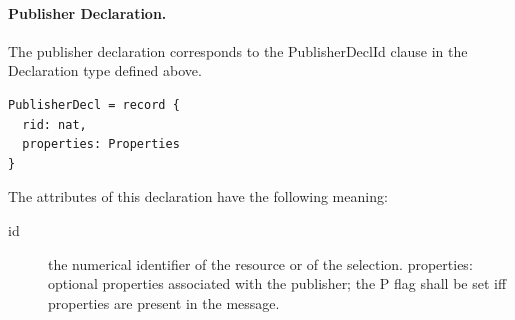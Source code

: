 \documentclass[a4paper,oneside,article]{memoir}
\begin{document}
\paragraph{Publisher Declaration.} The publisher declaration corresponds to the PublisherDeclId
clause in the Declaration type defined above.
\begin{verbatim}
PublisherDecl = record {
  rid: nat,
  properties: Properties
}
\end{verbatim}
The attributes of this declaration have the following meaning:
\begin{description}
\item[id] the numerical identifier of the resource or of the selection.  properties: optional
  properties associated with the publisher; the P flag shall be set iff properties are present in
  the message.
\end{description}
\end{document}
